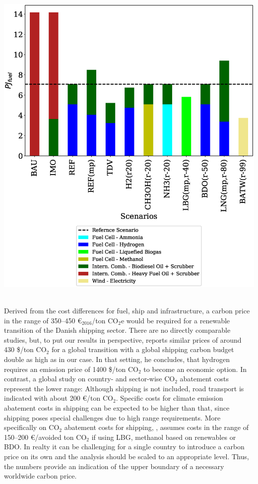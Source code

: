 \documentclass[article]{elsarticle}
\begin{document}
\begin{minipage}[t]{0.49\textwidth}
    \centering
    \captionsetup{justification=centering}
    \includegraphics[width=.95\textwidth]{figures/AllFuel2050.eps}
    \label{fig:AllFuel2050}
\end{minipage}\\[0.75cm]

Derived from the cost differences for fuel, ship and infrastructure, a carbon price in the range of 350--450 \euro$_{2016}$/ton CO$_2$e would be required for a renewable transition of the Danish shipping sector. There are no directly comparable studies, but, to put our results in perspective, \citet[p.197]{Raucci2017} reports similar prices of around 430 \$/ton CO$_2$ for a global transition with a global shipping carbon budget double as high as in our case. In that setting, he concludes, that hydrogen requires an emission price of 1400 \$/ton CO$_2$ to become an economic option. In contrast, a global study on country- and sector-wise CO$_2$ abatement costs \cite{OECD2016} represent the lower range: Although shipping is not included, road transport is indicated with about 200 \euro/ton CO$_2$. Specific costs for climate emission abatement costs in shipping can be expected to be higher than that, since shipping poses special challenges due to high range requirements. More specifically on CO$_2$ abatement costs for shipping, \citet{DNVGL2017}, assumes costs in the range of 150--200 \euro/avoided ton CO$_2$ if using LBG, methanol based on renewables or BDO. In realty it can be challenging for a single country to introduce a carbon price on its own and the analysis should be scaled to an appropriate level. Thus, the numbers provide an indication of the upper boundary of a necessary worldwide carbon price.
\end{document}
